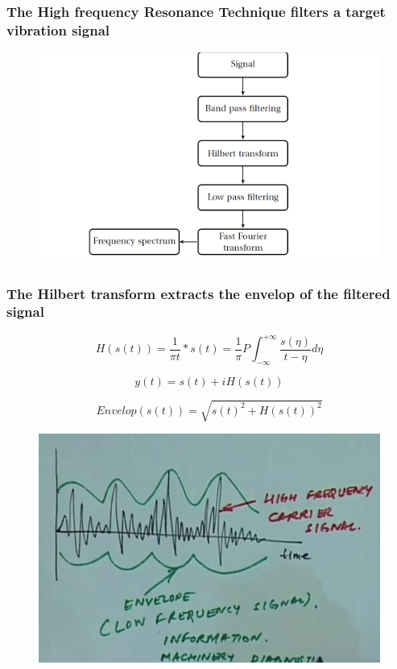\documentclass{beamer}
\begin{document}

\begin{frame}
	\frametitle{The High frequency Resonance Technique filters a target vibration signal}
	\begin{figure}[H]
		\centering
		
		\includegraphics[width=0.8\linewidth]{hfrt}
	\end{figure}
\end{frame}


\begin{frame}
	\frametitle{The Hilbert transform extracts the envelop of the filtered signal }
	\begin{equation}
		H(s(t)) = \frac{1}{\pi t}*s(t) = \frac{1}{\pi}P\int_{-\infty}^{+\infty}\frac{s(\eta)}{t-\eta}d\eta
	\end{equation}
	
	\begin{equation}
		y(t) = s(t) + iH(s(t))
	\end{equation}
	
	\begin{equation}
Envelop(s(t)) = \sqrt{s(t)^{2} + H(s(t))^{2}} 
	\end{equation}
	
	\begin{figure}[H]
		\centering
		
		\includegraphics[width=0.4\linewidth]{env}
	\end{figure}
	
\end{frame}
\end{document}
